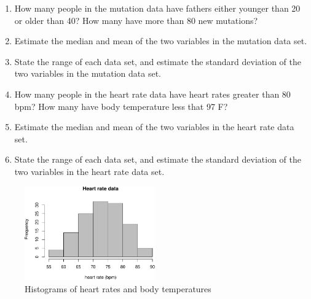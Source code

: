 \documentclass[
  letterpaper,
  DIV=11,
  numbers=noendperiod]{scrreprt}
\newenvironment{Shaded}{\begin{snugshade}}{\end{snugshade}}
\newcommand{\AttributeTok}[1]{\textcolor[rgb]{0.40,0.45,0.13}{#1}}
\newcommand{\ConstantTok}[1]{\textcolor[rgb]{0.56,0.35,0.01}{#1}}
\newcommand{\FunctionTok}[1]{\textcolor[rgb]{0.28,0.35,0.67}{#1}}
\newcommand{\NormalTok}[1]{\textcolor[rgb]{0.00,0.23,0.31}{#1}}
\newcommand{\OtherTok}[1]{\textcolor[rgb]{0.00,0.23,0.31}{#1}}
\newcommand{\SpecialCharTok}[1]{\textcolor[rgb]{0.37,0.37,0.37}{#1}}
\newcommand{\StringTok}[1]{\textcolor[rgb]{0.13,0.47,0.30}{#1}}
\begin{document}
\begin{enumerate}
\def\labelenumi{\arabic{enumi}.}
\item
  How many people in the mutation data have fathers either younger than
  20 or older than 40? How many have more than 80 new mutations?
\item
  Estimate the median and mean of the two variables in the mutation data
  set.
\item
  State the range of each data set, and estimate the standard deviation
  of the two variables in the mutation data set.
\item
  How many people in the heart rate data have heart rates greater than
  80 bpm? How many have body temperature less that 97 F?
\item
  Estimate the median and mean of the two variables in the heart rate
  data set.
\item
  State the range of each data set, and estimate the standard deviation
  of the two variables in the heart rate data set.
\end{enumerate}

\begin{Shaded}
\end{Shaded}

\begin{figure}[H]

{\centering \includegraphics[width=0.5\textwidth,height=\textheight]{./descriptive_files/figure-pdf/fig-ch3-HR-1.pdf}

}

\caption{\label{fig-ch3-HR-1}Histograms of heart rates and body
temperatures}

\end{figure}
\end{document}
